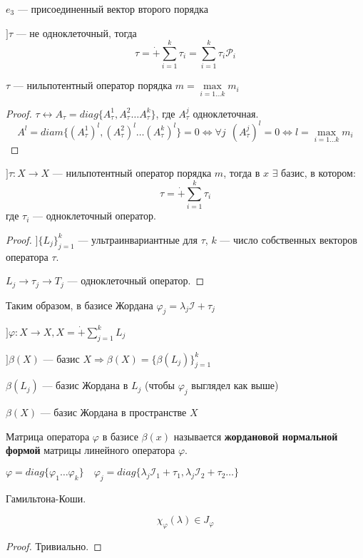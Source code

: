 $e_3$ --- присоединенный вектор второго порядка

$] \tau$ --- не одноклеточный, тогда $$\tau=\dot+ \sum_{i=1}^k \tau_i=\sum_{i=1}^k \tau_i\mathcal P_i$$

\begin{lemma}
    $\tau$ --- нильпотентный оператор порядка $m=\max\limits_{i=1\ldots k} m_i$
\end{lemma}
\begin{proof}
    $\tau\leftrightarrow A_\tau = diag \{A_\tau^1, A_\tau^2\ldots A_\tau^k\}$, где $A_\tau^j$ одноклеточная.
    $$A^l = diam \{(A_\tau^1)^{l}, (A_\tau^2)^l \ldots (A_\tau^k)^l\} = 0 \Leftrightarrow \forall j \ \ (A_\tau^j)^l = 0 \Leftrightarrow l=\max_{i=1\ldots k}m_i$$
\end{proof}

$] \tau : X\to X$ --- нильпотентный оператор порядка $m$, тогда в $x$ $\exists$ базис, в котором:
$$\tau = \dot+ \sum_{i=1}^k \tau_i$$
где $\tau_i$ --- одноклеточный оператор.
\begin{proof}
    $] \{L_j\}_{j=1}^k$ --- ультраинвариантные для $\tau$, $k$ --- число собственных векторов оператора $\tau$.

    $L_j\to \tau_j \to T_j$ --- одноклеточный оператор.
\end{proof}

Таким образом, в базисе Жордана $\varphi_j = \lambda_j \mathcal I + \tau_j$

$] \varphi : X\to X, X = \dot+\sum_{j=1}^k L_j$

$] \beta(X)$ --- базис $X \Rightarrow \beta(X) = \{\beta(L_j)\}_{j=1}^k$

$\beta(L_j)$ --- базис Жордана в $L_j$ (чтобы $\varphi_j$ выглядел как выше)

$\beta(X)$ --- базис Жордана в пространстве $X$

\begin{definition}
    Матрица оператора $\varphi$ в базисе $\beta(x)$ называется \textbf{жордановой нормальной формой} матрицы линейного оператора $\varphi$.
\end{definition}

$\varphi = diag \{\varphi_1 \ldots \varphi_k\} \quad \varphi_j=diag \{\lambda_j \mathcal I_1 + \tau_1, \lambda_j\mathcal I_2+\tau_2\ldots\}$

\begin{theorem}
    Гамильтона-Коши.

    $$\chi_\varphi(\lambda)\in J_\varphi$$
\end{theorem}
\begin{proof}
    Тривиально.
\end{proof}

